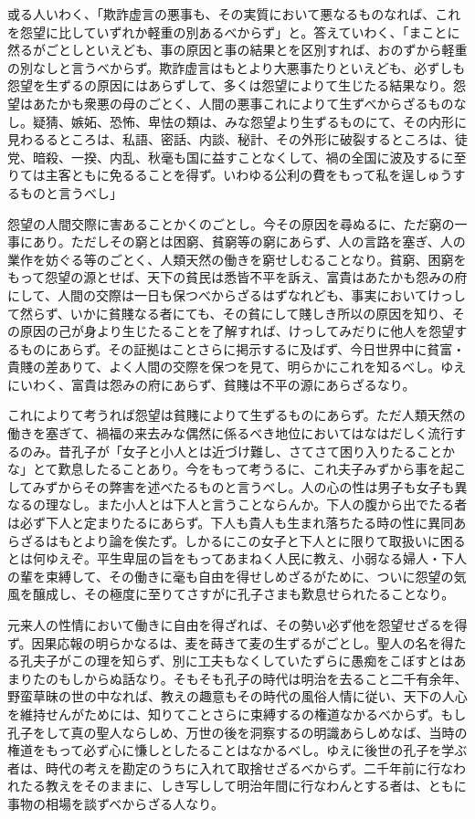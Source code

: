 \documentclass[a4paper, platex, dvipdfmx]{jsarticle}
\begin{document}
或る人いわく、「欺詐虚言の悪事も、その実質において悪なるものなれば、これを怨望に比していずれか軽重の別あるべからず」と。答えていわく、「まことに然るがごとしといえども、事の原因と事の結果とを区別すれば、おのずから軽重の別なしと言うべからず。欺詐虚言はもとより大悪事たりといえども、必ずしも怨望を生ずるの原因にはあらずして、多くは怨望によりて生じたる結果なり。怨望はあたかも衆悪の母のごとく、人間の悪事これによりて生ずべからざるものなし。疑猜、嫉妬、恐怖、卑怯の類は、みな怨望より生ずるものにて、その内形に見わるるところは、私語、密話、内談、秘計、その外形に破裂するところは、徒党、暗殺、一揆、内乱、秋毫も国に益すことなくして、禍の全国に波及するに至りては主客ともに免るることを得ず。いわゆる公利の費をもって私を逞しゅうするものと言うべし」

怨望の人間交際に害あることかくのごとし。今その原因を尋ぬるに、ただ窮の一事にあり。ただしその窮とは困窮、貧窮等の窮にあらず、人の言路を塞ぎ、人の業作を妨ぐる等のごとく、人類天然の働きを窮せしむることなり。貧窮、困窮をもって怨望の源とせば、天下の貧民は悉皆不平を訴え、富貴はあたかも怨みの府にして、人間の交際は一日も保つべからざるはずなれども、事実においてけっして然らず、いかに貧賤なる者にても、その貧にして賤しき所以の原因を知り、その原因の己が身より生じたることを了解すれば、けっしてみだりに他人を怨望するものにあらず。その証拠はことさらに掲示するに及ばず、今日世界中に貧富・貴賤の差ありて、よく人間の交際を保つを見て、明らかにこれを知るべし。ゆえにいわく、富貴は怨みの府にあらず、貧賤は不平の源にあらざるなり。

これによりて考うれば怨望は貧賤によりて生ずるものにあらず。ただ人類天然の働きを塞ぎて、禍福の来去みな偶然に係るべき地位においてはなはだしく流行するのみ。昔孔子が「女子と小人とは近づけ難し、さてさて困り入りたることかな」とて歎息したることあり。今をもって考うるに、これ夫子みずから事を起こしてみずからその弊害を述べたるものと言うべし。人の心の性は男子も女子も異なるの理なし。また小人とは下人と言うことならんか。下人の腹から出でたる者は必ず下人と定まりたるにあらず。下人も貴人も生まれ落ちたる時の性に異同あらざるはもとより論を俟たず。しかるにこの女子と下人とに限りて取扱いに困るとは何ゆえぞ。平生卑屈の旨をもってあまねく人民に教え、小弱なる婦人・下人の輩を束縛して、その働きに毫も自由を得せしめざるがために、ついに怨望の気風を醸成し、その極度に至りてさすがに孔子さまも歎息せられたることなり。

元来人の性情において働きに自由を得ざれば、その勢い必ず他を怨望せざるを得ず。因果応報の明らかなるは、麦を蒔きて麦の生ずるがごとし。聖人の名を得たる孔夫子がこの理を知らず、別に工夫もなくしていたずらに愚痴をこぼすとはあまりたのもしからぬ話なり。そもそも孔子の時代は明治を去ること二千有余年、野蛮草昧の世の中なれば、教えの趣意もその時代の風俗人情に従い、天下の人心を維持せんがためには、知りてことさらに束縛するの権道なかるべからず。もし孔子をして真の聖人ならしめ、万世の後を洞察するの明識あらしめなば、当時の権道をもって必ず心に慊しとしたることはなかるべし。ゆえに後世の孔子を学ぶ者は、時代の考えを勘定のうちに入れて取捨せざるべからず。二千年前に行なわれたる教えをそのままに、しき写しして明治年間に行なわんとする者は、ともに事物の相場を談ずべからざる人なり。
\end{document}
